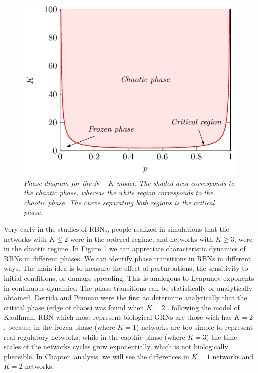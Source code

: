 \begin{figure}[h]
\centering
\includegraphics[scale=1.2]{images/phase-transition.pdf}
\caption{\emph{Phase diagram for the $N-K$ model. The shaded area corresponds
to the chaotic phase, whereas the white region corresponds to the chaotic phase.
The curve separating both regions is the critical phase.}}
\label{fig:ph-tr}
\end{figure}

Very early in the studies of
RBNs, people realized in simulations that the networks with
$K \le 2$ were in the ordered regime, and networks with $K \ge 3$,
were in the chaotic regime. In Figure \ref{fig:ph-tr} we can appreciate
characteristic dynamics of RBNs in different phases.
We can identify phase transitions in RBNs in different
ways. The main idea is to measure the effect of perturbations, the sensitivity to initial conditions, or damage spreading. This is analogous to Lyapunov exponents in continuous
dynamics.
The phase transitions can be statistically or analytically
obtained. Derrida and Pomeau were the first to determine
analytically that the critical phase (edge of chaos) was found
when $K = 2$ \cite{K8}.
following the model of Kauffman, RBN which most represent biological GRNs are those wich has $K=2$ \cite{K6}, because in the frozen phase (where $K=1$) networks are too simple to represent real regulatory networks; while in the caothic phase (where $K=3$) the time scales of the networks cycles grow exponentially, which is not biologically pheasible.
In Chapter \ref{analysis} we will see the differences in $K=1$ networks and $K=2$ networks.


